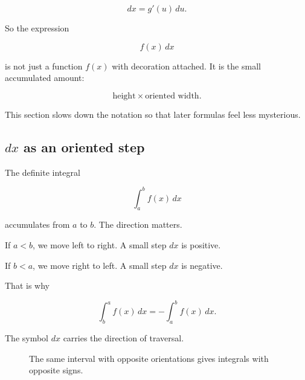 \[
dx=g'(u)\,du.
\]

So the expression

\[
f(x)\,dx
\]

is not just a function \(f(x)\) with decoration attached.  It is the small accumulated
amount:

\[
\text{height}\times\text{oriented width}.
\]

This section slows down the notation so that later formulas feel less mysterious.

\subsection{\texorpdfstring{\(dx\)}{dx} as an oriented step}
\label{subsec:dx-oriented-step}

The definite integral

\[
\int_a^b f(x)\,dx
\]

accumulates from \(a\) to \(b\).  The direction matters.

If \(a<b\), we move left to right.  A small step \(dx\) is positive.

If \(b<a\), we move right to left.  A small step \(dx\) is negative.

That is why

\[
\boxed{
\int_b^a f(x)\,dx=-\int_a^b f(x)\,dx.
}
\]

The symbol \(dx\) carries the direction of traversal.

\begin{figure}[h]
\centering
{}
\caption{The same interval with opposite orientations gives integrals with opposite signs.}
\label{fig:oriented-interval}
\end{figure}

